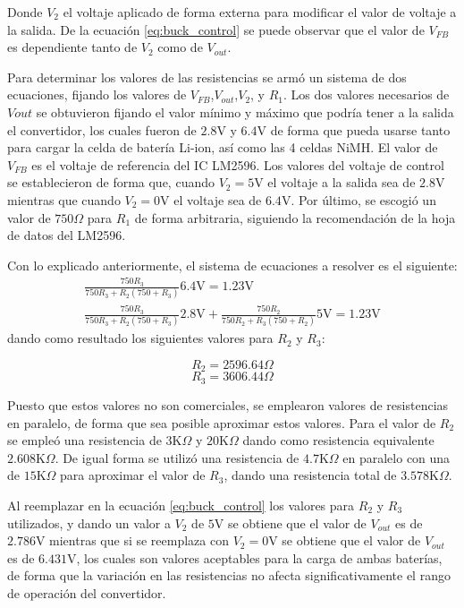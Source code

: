     Donde $V_2$ el voltaje aplicado de forma externa para modificar el valor
    de voltaje a la salida. De la ecuación \ref*{eq:buck_control} se puede 
    observar que el valor de $V_{FB}$ es dependiente tanto de $V_2$ como de
    $V_{out}$. 

    Para determinar los valores de las resistencias se armó un sistema de dos ecuaciones,
    fijando los valores de $V_{FB}$,$V_{out}$,$V_2$, y $R_1$. Los dos valores necesarios
    de $V{out}$ se obtuvieron fijando el valor mínimo y máximo que podría tener a la salida
    el convertidor, los cuales fueron de $2.8\text{V}$ y $6.4\text{V}$ de forma que pueda usarse tanto para 
    cargar la celda de batería Li-ion, así como las 4 celdas NiMH. El valor de $V_{FB}$ 
    es el voltaje de referencia del IC LM2596. Los valores del voltaje de control se
    establecieron de forma que, cuando $V_2 = 5\text{V}$ el voltaje a la salida sea de 
    $2.8\text{V}$ mientras que cuando  $V_2 = 0\text{V}$ el voltaje sea de $6.4\text{V}$.
    Por último, se escogió un valor de $750\Omega$ para $R_1$ de forma arbitraria, siguiendo
    la recomendación de la hoja de datos del LM2596.

    Con lo explicado anteriormente, el sistema de ecuaciones a resolver es el siguiente:
    \begin{eqnarray}
        \frac{750R_3}{ 750R_3 + R_2(750 + R_3)} 6.4\text{V} = 1.23\text{V} \\
        \frac{750R_3}{ 750R_3 + R_2(750 + R_3)} 2.8\text{V} + \frac{750R_2}{750R_2+R_3(750+R_2)} 5\text{V} = 1.23\text{V}   
    \end{eqnarray}
    dando como resultado los siguientes valores para $R_2$ y $R_3$:

    $$R_2 = 2596.64\Omega$$ 
    $$R_3 = 3606.44\Omega$$

    Puesto que estos valores no son comerciales, se emplearon valores de resistencias en 
    paralelo, de forma que sea posible aproximar estos valores. Para el valor de $R_2$ 
    se empleó una resistencia de $3\text{K}\Omega$ y $20\text{K}\Omega$ dando como 
    resistencia equivalente $2.608\text{K}\Omega$. De igual forma se utilizó una 
    resistencia de $4.7\text{K}\Omega$ en paralelo con una de $15\text{K}\Omega$ para aproximar
    el valor de $R_3$, dando una resistencia total de $3.578\text{K}\Omega$.

    Al reemplazar en la ecuación \ref{eq:buck_control} los valores para $R_2$ y $R_3$ utilizados, 
    y dando un valor a $V_2$ de $5\text{V}$ se obtiene que el valor de $V_{out}$ es de $2.786\text{V}$
    mientras que si se reemplaza con $V_2 = 0\text{V}$ se obtiene que el valor de $V_{out}$ es de
    $6.431\text{V}$, los cuales son valores aceptables para la carga de ambas baterías,
    de forma que la variación en las resistencias no afecta significativamente
    el rango de operación del convertidor.

